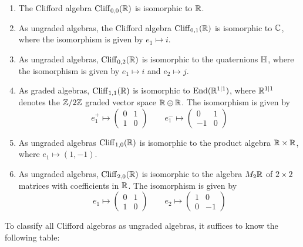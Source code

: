 \begin{exmp}\enumbreak
\begin{enumerate}
  \item The Clifford algebra $\operatorname{Cliff}_{0,0}(\mathbb{R})$ is isomorphic to $\mathbb{R}$.
  \item As ungraded algebras, the Clifford algebra $\operatorname{Cliff}_{0,1}(\mathbb{R})$ is isomorphic
  to $\mathbb{C}$, where the isomorphism is given by $e_1 \mapsto i$.
  \item As ungraded algebras, $\operatorname{Cliff}_{0,2}(\mathbb{R})$ is isomorphic to the quaternions
  $\mathbb{H}$, where the isomorphism is given by $e_1 \mapsto i$ and $e_2 \mapsto j$.
  \item As graded algebras, $\operatorname{Cliff}_{1,1}(\mathbb{R})$ is isomorphic to $\operatorname{End}(\mathbb{R}^{1|1})$,
  where $\mathbb{R}^{1|1}$ denotes the $\mathbb{Z}/2\mathbb{Z}$ graded vector space $\mathbb{R} \oplus \mathbb{R}$.
  The isomorphism is given by
  \[
  e_1^+ \mapsto \begin{pmatrix}
  0 & 1 \\
  1 & 0
  \end{pmatrix} \qquad e_1^- \mapsto \begin{pmatrix}
  0 & 1 \\
  -1 & 0
  \end{pmatrix}
  \]
  \item As ungraded algebras $\operatorname{Cliff}_{1,0}(\mathbb{R})$ is isomorphic to the product
  algebra $\mathbb{R} \times \mathbb{R}$, where $e_1 \mapsto (1,-1)$.
  \item As ungraded algebras, $\operatorname{Cliff}_{2,0}(\mathbb{R})$ is isomorphic to the algebra $M_2\mathbb{R}$
  of $2 \times 2$ matrices with coefficients in $\mathbb{R}$. The isomorphism is given by
  \[
  e_1 \mapsto \begin{pmatrix}
  0 & 1 \\
  1 & 0
  \end{pmatrix} \qquad e_2 \mapsto \begin{pmatrix}
  1 & 0 \\
  0 & -1
  \end{pmatrix}
  \]
\end{enumerate}
\end{exmp}
%
To classify all Clifford algebras as ungraded algebras, it suffices to know
the following table: \\\\
